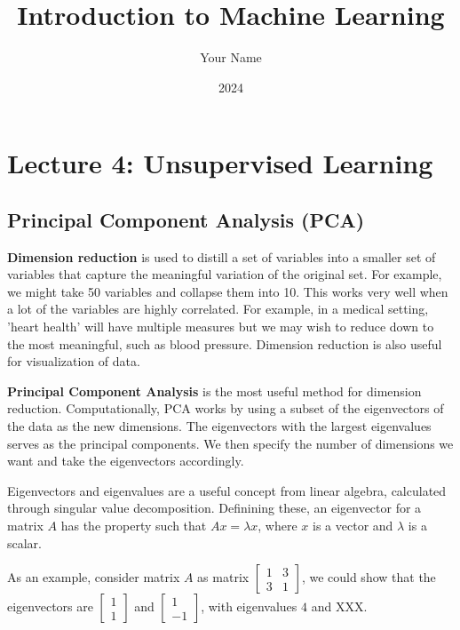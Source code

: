 \documentclass[11pt]{article}
\title{Introduction to Machine Learning}
\author{Your Name}
\date{2024}
\begin{document}
\maketitle

\section{Lecture 4: Unsupervised Learning}

\subsection{Principal Component Analysis (PCA)}

\textbf{Dimension reduction} is used to distill a set of variables into a smaller set of variables that capture the meaningful variation of the original set.
For example, we might take 50 variables and collapse them into 10.
This works very well when a lot of the variables are highly correlated.
For example, in a medical setting, 'heart health' will have multiple measures but we may wish to reduce down to the most meaningful, such as blood pressure.
Dimension reduction is also useful for visualization of data.

\textbf{Principal Component Analysis} is the most useful method for dimension reduction.
Computationally, PCA works by using a subset of the eigenvectors of the data as the new dimensions.
The eigenvectors with the largest eigenvalues serves as the principal components.
We then specify the number of dimensions we want and take the eigenvectors accordingly.

Eigenvectors and eigenvalues are a useful concept from linear algebra, calculated through singular value decomposition. Definining these, an eigenvector for a matrix $A$ has the property such that $Ax = \lambda x$, where $x$ is a vector and $\lambda$ is a scalar.

As an example, consider matrix $A$ as matrix $ \begin{bmatrix}
    1 & 3\\
    3 & 1
\end{bmatrix}$, we could show that the eigenvectors are $ \begin{bmatrix}
    1\\
    1
\end{bmatrix}$ and $ \begin{bmatrix}
    1\\
    -1
\end{bmatrix}$, with eigenvalues $4$ and XXX.
\end{document}
